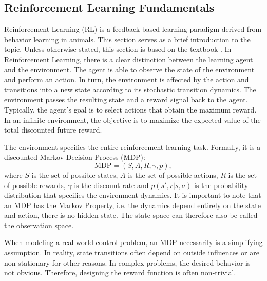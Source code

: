 \subsection{Reinforcement Learning Fundamentals}
Reinforcement Learning (RL) is a feedback-based learning paradigm derived from behavior learning in animals.
This section serves as a brief introduction to the topic.
Unless otherwise stated, this section is based on the textbook \cite{sutton2018ReinforcementLearningIntroduction}.
In Reinforcement Learning, there is a clear distinction between the learning agent and the environment.
The agent is able to observe the state of the environment and perform an action.
In turn, the environment is affected by the action and transitions into a new state according to its stochastic transition dynamics.
The environment passes the resulting state and a reward signal back to the agent.
Typically, the agent's goal is to select actions that obtain the maximum reward.
In an infinite environment, the objective is to maximize the expected value of the total discounted future reward.

The environment specifies the entire reinforcement learning task.
Formally, it is a discounted Markov Decision Process (MDP):
$$ \text{MDP} = (S, A, R, \gamma, p),$$
where $S$ is the set of possible states, $A$ is the set of possible actions, $R$ is the set of possible rewards, $\gamma$ is the discount rate and $p(s', r|s,a)$ is the probability distribution that specifies the environment dynamics.
It is important to note that an MDP has the Markov Property, i.e. the dynamics depend entirely on the state and action, there is no hidden state.
The state space can therefore also be called the observation space.

When modeling a real-world control problem, an MDP necessarily is a simplifying assumption.
In reality, state transitions often depend on outside influences or are non-stationary for other reasons.
In complex problems, the desired behavior is not obvious. Therefore, designing the reward function is often non-trivial.



